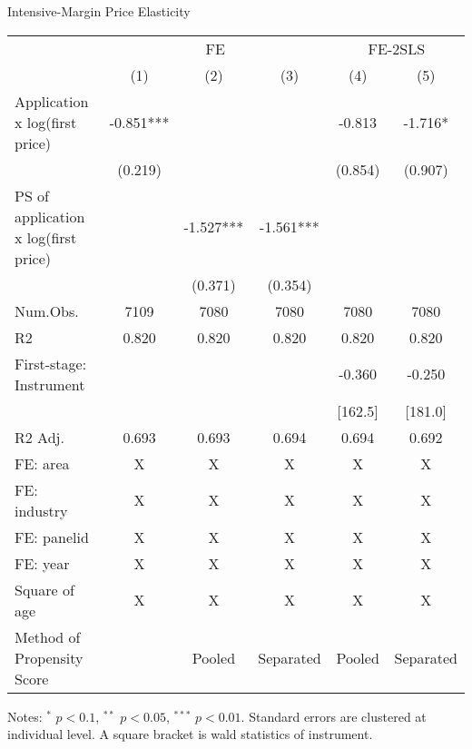 \documentclass[
  ignorenonframetext,
  aspectratio=169,
]{beamer}
\begin{document}
\begin{frame}{Intensive-Margin Price Elasticity}
\protect\hypertarget{intensive-margin-price-elasticity}{}
\begin{table}
\centering
\fontsize{7}{9}\selectfont
\begin{threeparttable}
\begin{tabular}[t]{lccccc}
\toprule
\multicolumn{1}{c}{ } & \multicolumn{3}{c}{FE} & \multicolumn{2}{c}{FE-2SLS} \\
\cmidrule(l{3pt}r{3pt}){2-4} \cmidrule(l{3pt}r{3pt}){5-6}
  & (1) & (2) & (3) & (4) & (5)\\
\midrule
Application x log(first price) & -0.851*** &  &  & -0.813 & -1.716*\\
 & (0.219) &  &  & (0.854) & (0.907)\\
PS of application x log(first price) &  & -1.527*** & -1.561*** &  & \\
 &  & (0.371) & (0.354) &  & \\
\midrule
Num.Obs. & 7109 & 7080 & 7080 & 7080 & 7080\\
R2 & 0.820 & 0.820 & 0.820 & 0.820 & 0.820\\
First-stage: Instrument &  &  &  & -0.360 & -0.250\\
 &  &  &  & [162.5] & [181.0]\\
R2 Adj. & 0.693 & 0.693 & 0.694 & 0.694 & 0.692\\
FE: area & X & X & X & X & X\\
FE: industry & X & X & X & X & X\\
FE: panelid & X & X & X & X & X\\
FE: year & X & X & X & X & X\\
Square of age & X & X & X & X & X\\
Method of Propensity Score &  & Pooled & Separated & Pooled & Separated\\
\bottomrule
\end{tabular}
\begin{tablenotes}
\item Notes: $^{*}$ $p < 0.1$, $^{**}$ $p < 0.05$, $^{***}$ $p < 0.01$. Standard errors are clustered at individual level. A square bracket is wald statistics of instrument.
\end{tablenotes}
\end{threeparttable}
\end{table}
\end{frame}
\end{document}
